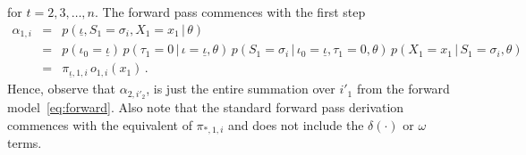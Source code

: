 \documentclass[a4paper]{article}
\newcommand{\ui}{\underline{\iota}}
\begin{document}
for $t=2,3,\ldots,n$. The forward pass commences with the first step
\begin{eqnarray}
  \alpha_{1,i} & = & p(\ui,S_1=\sigma_{i},X_1\!=\!x_1\,|\,\theta) 
\nonumber\\& = & 
  p(\iota_0\!=\!\ui)\,p(\tau_1\!=\!0\,|\,\iota\!=\!\ui,\theta)
\,p(S_1\!=\!\sigma_i\,|\,\iota_0\!=\!\ui,\tau_1\!=\!0,\theta)\,p(X_1\!=\!x_1\,|\,S_1\!=\!\sigma_i,\theta)
\nonumber\\& = & 
  \pi_{\ui,1,i}\,o_{1,i}(x_1)
\,.
\label{eq:alpha_1}
\end{eqnarray}
Hence, observe that $\alpha_{2,i'_2}$, is just
the entire summation over $i'_1$ from the forward model~\eqref{eq:forward}.
Also note that the standard forward pass derivation commences with the equivalent of $\pi_{*,1,i}$ and does not include the
$\delta(\cdot)$ or $\omega$ terms.
\end{document}
